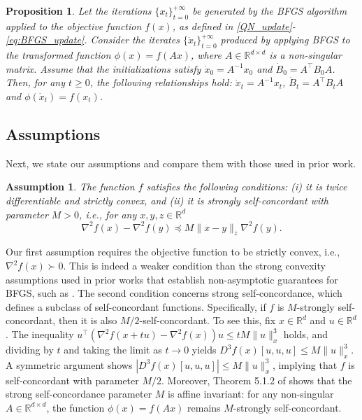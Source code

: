 \documentclass[11pt,letterpaper]{article}
\newcommand\0{{\Vector{0}}}
\newcommand\1{{\Vector{1}}}
\newtheorem{assumption}{Assumption}
\newtheorem{proposition}[theorem]{Proposition}
\numberwithin{assumption}{section}
\numberwithin{definition}{section}
\numberwithin{theorem}{section}
\numberwithin{remark}{section}
\begin{document}
\begin{proposition}\label{BFGS_affine}
    Let the iterations $\{x_t\}_{t=0}^{+\infty}$ be generated by the BFGS algorithm applied to the objective function $f(x)$, as defined in \eqref{QN_update}-\eqref{eq:BFGS_update}. Consider the iterates $\{\dot{x}_t\}_{t=0}^{+\infty}$ produced by applying BFGS to the transformed function $\phi(x) = f(Ax)$, where $A \in \mathbb{R}^{d \times d}$ is a non-singular matrix. Assume that the initializations satisfy $\dot{x}_0 = A^{-1}x_0$ and $\dot{B}_0 = A^\top B_0 A$. Then, for any $t \geq 0$, the following relationships hold: $\dot{x}_t = A^{-1}x_t$, $\dot{B}_t = A^\top B_t A$ and $\phi(\dot{x}_t) = f(x_t)$.
\end{proposition}


\subsection{Assumptions}
Next, we state our assumptions and compare them with those used in prior work.

\begin{assumption}\label{ass_self_concodant}
The function $f$ satisfies the following conditions: (i) it is twice differentiable and strictly convex, and (ii) it is strongly self-concordant with parameter $M > 0$, i.e., for any $x, y, z \in \mathbb{R}^d$
\begin{equation}
\nabla^2{f(x)} - \nabla^2{f(y)} \preceq M\|x - y\|_{z}\nabla^2{f(y)}.
\end{equation}
\end{assumption}
Our first assumption requires the objective function to be strictly convex, i.e., $\nabla^2 f(x) \succ 0$. This is indeed a weaker condition than the strong convexity assumptions used in prior works that establish non-asymptotic guarantees for BFGS, such as \cite{rodomanov2020rates,rodomanov2020ratesnew,ye2023towards,qiujiang2020quasinewton,krutikov2023convergence,antonglobal,jin2024non,qiujiang2024quasinewton}. The second condition concerns strong self-concordance, which defines a subclass of self-concordant functions. Specifically, if $f$ is $M$-strongly self-concordant, then it is also $M/2$-self-concordant. To see this, fix $x \in \mathbb{R}^d$ and $u \in \mathbb{R}^d$. The inequality $u^\top (\nabla^2{f(x + tu)} - \nabla^2{f(x)}) u \leq tM\|u\|^{3}_{x}$ holds, and dividing by $t$ and taking the limit as $t \to 0$ yields $D^{3}f(x)[u, u, u] \leq M\|u\|^{3}_{x}$. A symmetric argument shows $|D^{3}f(x)[u, u, u]| \leq M\|u\|^{3}_{x}$, implying that $f$ is self-concordant with parameter $M/2$. Moreover, Theorem 5.1.2 of \cite{convexlecture} shows that the strong self-concordance parameter $M$ is affine invariant: for any non-singular $A \in \mathbb{R}^{d\times d}$, the function $\phi(x) = f(Ax)$ remains $M$-strongly self-concordant.
\end{document}
